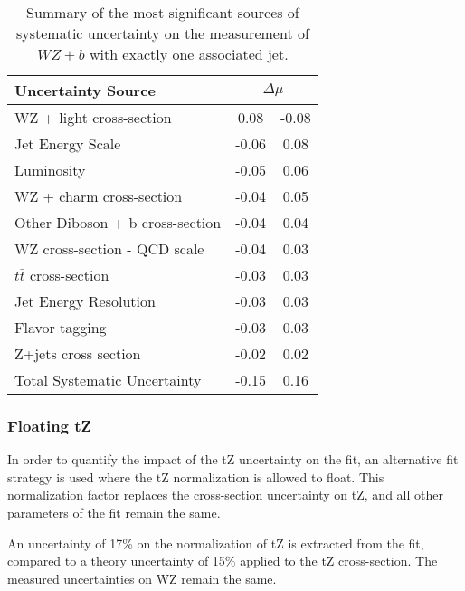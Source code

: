 \begin{table}[H]                                                                                                             
    \centering                                                                                                               
    \begin{tabular}{l|cc}
        \hline\hline
        Uncertainty Source & \multicolumn{2}{c}{$\Delta \mu$ }  \\
        \hline
        WZ + light cross-section & 0.08 & -0.08 \\
        Jet Energy Scale & -0.06 & 0.08 \\
        Luminosity & -0.05 & 0.06 \\
        WZ + charm cross-section & -0.04 & 0.05 \\
        Other Diboson + b cross-section & -0.04 & 0.04 \\
        WZ cross-section - QCD scale & -0.04 & 0.03 \\
        $t\bar{t}$ cross-section & -0.03 & 0.03 \\
        Jet Energy Resolution & -0.03 & 0.03 \\
        Flavor tagging & -0.03 & 0.03 \\
        Z+jets cross section & -0.02 & 0.02 \\
        \hline
        Total Systematic Uncertainty & -0.15 & 0.16 \\
        \hline\hline
  \end{tabular}
  \caption{Summary of the most significant sources of systematic uncertainty on the measurement of $WZ+b$ with exactly one associated jet.}
  \label{tab:systematics_tZ1j}
\end{table}

\subsubsection{Floating tZ}
\label{sec:float_tZ}

In order to quantify the impact of the tZ uncertainty on the fit, an alternative fit strategy is used where the tZ normalization is allowed to float. This normalization factor replaces the cross-section uncertainty on tZ, and all other parameters of the fit remain the same.

An uncertainty of 17\% on the normalization of tZ is extracted from the fit, compared to a theory uncertainty of 15\% applied to the tZ cross-section. The measured uncertainties on WZ remain the same.
